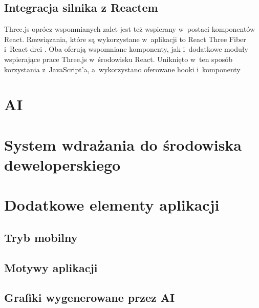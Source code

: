 \subsection{Integracja silnika z Reactem}
Three.js oprócz wspomnianych zalet jest też wspierany w~postaci komponentów React.
Rozwiązania, które są wykorzystane w~aplikacji to React Three Fiber
\cite{ReactThreeFiber} i~React drei \cite{ReactDrei}. Oba oferują
wspomniane komponenty, jak i~dodatkowe moduły
wspierające prace Three.js w~środowisku React. Uniknięto w~ten sposób korzystania
z~JavaScript'a, a~wykorzystano oferowane hooki i~komponenty



\section{AI}

\section{System wdrażania do środowiska deweloperskiego}



\section{Dodatkowe elementy aplikacji}

\subsection{Tryb mobilny}

\subsection{Motywy aplikacji}

\subsection{Grafiki wygenerowane przez AI}
